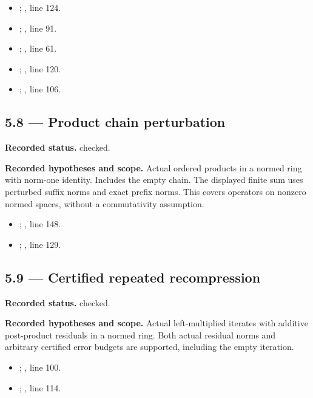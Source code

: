 \begin{itemize}
\item {}; , line 124.
\item {}; , line 91.
\item {}; , line 61.
\item {}; , line 120.
\item {}; , line 106.
\end{itemize}
\subsection{5.8 — Product chain perturbation}
\label{result:5.8}
\textbf{Recorded status.} checked.

\textbf{Recorded hypotheses and scope.} Actual ordered products in a normed ring with norm-one identity. Includes the empty chain. The displayed finite sum uses perturbed suffix norms and exact prefix norms. This covers operators on nonzero normed spaces, without a commutativity assumption.

\begin{itemize}
\item {}; , line 148.
\item {}; , line 129.
\end{itemize}
\subsection{5.9 — Certified repeated recompression}
\label{result:5.9}
\textbf{Recorded status.} checked.

\textbf{Recorded hypotheses and scope.} Actual left-multiplied iterates with additive post-product residuals in a normed ring. Both actual residual norms and arbitrary certified error budgets are supported, including the empty iteration.

\begin{itemize}
\item {}; , line 100.
\item {}; , line 114.
\end{itemize}
